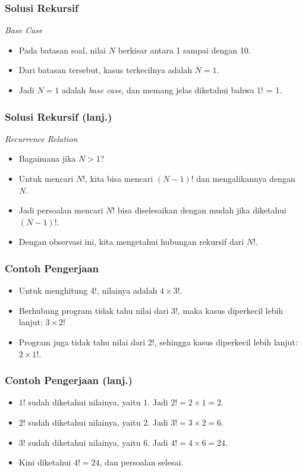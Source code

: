 \begin{frame}
\frametitle{Solusi Rekursif}
\textit{Base Case}
\begin{itemize}
  \item Pada batasan soal, nilai $N$ berkisar antara 1 sampai dengan 10.
  \item Dari batasan tersebut, kasus terkecilnya adalah $N=1$.
  \item Jadi $N=1$ adalah \textit{base case}, dan memang jelas diketahui bahwa 1! = 1.
\end{itemize}
\end{frame}

\begin{frame}
\frametitle{Solusi Rekursif (lanj.) }
\textit{Recurrence Relation}
\begin{itemize}
  \item Bagaimana jika $N > 1$?
  \item Untuk mencari $N!$, kita bisa mencari $(N-1)!$ dan mengalikannya dengan $N$.
  \item Jadi persoalan mencari $N!$ bisa diselesaikan dengan mudah jika diketahui $(N-1)!$.
  \item Dengan observasi ini, kita mengetahui hubungan rekursif dari $N!$. 
\end{itemize}
\end{frame}

\begin{frame}
\frametitle{Contoh Pengerjaan}
\begin{itemize}
  \item Untuk menghitung $4!$, nilainya adalah $4 \times 3!$.
  \item Berhubung program tidak tahu nilai dari $3!$, maka kasus diperkecil lebih lanjut: $3 \times 2!$
  \item Program juga tidak tahu nilai dari $2!$, sehingga kasus diperkecil lebih lanjut: $2 \times 1!$.
\end{itemize}
\end{frame}

\begin{frame}
\frametitle{Contoh Pengerjaan (lanj.)}
\begin{itemize}
  \item $1!$ sudah diketahui nilainya, yaitu $1$. Jadi $2! = 2 \times 1 = 2$.
  \item $2!$ sudah diketahui nilainya, yaitu $2$. Jadi $3! = 3 \times 2 = 6$.
  \item $3!$ sudah diketahui nilainya, yaitu $6$. Jadi $4! = 4 \times 6 = 24$.
  \item Kini diketahui $4! = 24$, dan persoalan selesai.
\end{itemize}
\end{frame}

